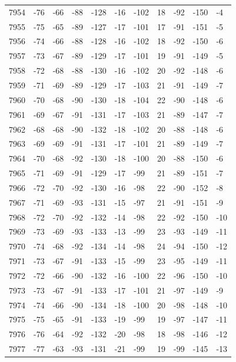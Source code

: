 \begin{table}[H]
\begin{tabular}{lllllllllll}
7954 & -76 & -66 & -88 & -128 & -16 & -102 & 18 & -92 & -150 & -4 \\
7955 & -75 & -65 & -89 & -127 & -17 & -101 & 17 & -91 & -151 & -5 \\
7956 & -74 & -66 & -88 & -128 & -16 & -102 & 18 & -92 & -150 & -6 \\
7957 & -73 & -67 & -89 & -129 & -17 & -101 & 19 & -91 & -149 & -5 \\
7958 & -72 & -68 & -88 & -130 & -16 & -102 & 20 & -92 & -148 & -6 \\
7959 & -71 & -69 & -89 & -129 & -17 & -103 & 21 & -91 & -149 & -7 \\
7960 & -70 & -68 & -90 & -130 & -18 & -104 & 22 & -90 & -148 & -6 \\
7961 & -69 & -67 & -91 & -131 & -17 & -103 & 21 & -89 & -147 & -7 \\
7962 & -68 & -68 & -90 & -132 & -18 & -102 & 20 & -88 & -148 & -6 \\
7963 & -69 & -69 & -91 & -131 & -17 & -101 & 21 & -89 & -149 & -7 \\
7964 & -70 & -68 & -92 & -130 & -18 & -100 & 20 & -88 & -150 & -6 \\
7965 & -71 & -69 & -91 & -129 & -17 & -99 & 21 & -89 & -151 & -7 \\
7966 & -72 & -70 & -92 & -130 & -16 & -98 & 22 & -90 & -152 & -8 \\
7967 & -71 & -69 & -93 & -131 & -15 & -97 & 21 & -91 & -151 & -9 \\
7968 & -72 & -70 & -92 & -132 & -14 & -98 & 22 & -92 & -150 & -10 \\
7969 & -73 & -69 & -93 & -133 & -13 & -99 & 23 & -93 & -149 & -11 \\
7970 & -74 & -68 & -92 & -134 & -14 & -98 & 24 & -94 & -150 & -12 \\
7971 & -73 & -67 & -91 & -133 & -15 & -99 & 23 & -95 & -149 & -11 \\
7972 & -72 & -66 & -90 & -132 & -16 & -100 & 22 & -96 & -150 & -10 \\
7973 & -73 & -67 & -91 & -133 & -17 & -101 & 21 & -97 & -149 & -9 \\
7974 & -74 & -66 & -90 & -134 & -18 & -100 & 20 & -98 & -148 & -10 \\
7975 & -75 & -65 & -91 & -133 & -19 & -99 & 19 & -97 & -147 & -11 \\
7976 & -76 & -64 & -92 & -132 & -20 & -98 & 18 & -98 & -146 & -12 \\
7977 & -77 & -63 & -93 & -131 & -21 & -99 & 19 & -99 & -145 & -13 \\

\end{tabular}
\end{table}
